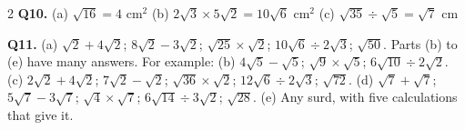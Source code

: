 \documentclass[12pt,a4paper]{article}
\begin{document}
{\begin{multicols}{2}
\textbf{Q10.} (a) $\sqrt{16}=4$ cm$^2$ \quad
(b) $2\sqrt{3}\times5\sqrt{2}=10\sqrt{6}$ cm$^2$ \quad
(c) $\sqrt{35}\div\sqrt{5}=\sqrt{7}$ cm

\textbf{Q11.} (a) $\sqrt{2}+4\sqrt{2}$; \; $8\sqrt{2}-3\sqrt{2}$; \;
$\sqrt{25}\times\sqrt{2}$; \; $10\sqrt{6}\div2\sqrt{3}$; \; $\sqrt{50}$.
\quad Parts (b) to (e) have many answers. For example:
(b) $4\sqrt{5}-\sqrt{5}$; \; $\sqrt{9}\times\sqrt{5}$; \;
$6\sqrt{10}\div2\sqrt{2}$. \quad
(c) $2\sqrt{2}+4\sqrt{2}$; \; $7\sqrt{2}-\sqrt{2}$; \;
$\sqrt{36}\times\sqrt{2}$; \; $12\sqrt{6}\div2\sqrt{3}$; \; $\sqrt{72}$.
\quad
(d) $\sqrt{7}+\sqrt{7}$; \; $5\sqrt{7}-3\sqrt{7}$; \;
$\sqrt{4}\times\sqrt{7}$; \; $6\sqrt{14}\div3\sqrt{2}$; \; $\sqrt{28}$.
\quad (e) Any surd, with five calculations that give it.

\end{multicols}
}
\end{document}
